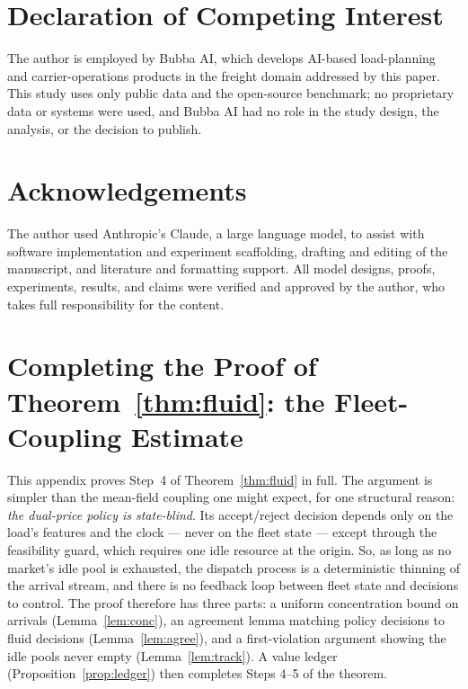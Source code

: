 \documentclass[11pt]{article}
\begin{document}
\section*{Declaration of Competing Interest}

The author is employed by Bubba AI, which develops AI-based
load-planning and carrier-operations products in the freight domain
addressed by this paper. This study uses only public data and the
open-source benchmark; no proprietary data or systems were used, and
Bubba AI had no role in the study design, the analysis, or the decision
to publish.

\section*{Acknowledgements}

The author used Anthropic's Claude, a large language model, to assist
with software implementation and experiment scaffolding, drafting and
editing of the manuscript, and literature and formatting support. All
model designs, proofs, experiments, results, and claims were verified
and approved by the author, who takes full responsibility for the
content.

\appendix

\section{Completing the Proof of Theorem~\ref{thm:fluid}: the
Fleet-Coupling Estimate}
\label{sec:coupling}

This appendix proves Step~4 of Theorem~\ref{thm:fluid} in full. The
argument is simpler than the mean-field coupling one might expect, for
one structural reason: \emph{the dual-price policy is state-blind}. Its
accept/reject decision depends only on the load's features and the
clock --- never on the fleet state --- except through the feasibility
guard, which requires one idle resource at the origin. So, as long as
no market's idle pool is exhausted, the dispatch process is a
deterministic thinning of the arrival stream, and there is no feedback
loop between fleet state and decisions to control. The proof therefore
has three parts: a uniform concentration bound on arrivals
(Lemma~\ref{lem:conc}), an agreement lemma matching policy decisions to
fluid decisions (Lemma~\ref{lem:agree}), and a first-violation argument
showing the idle pools never empty (Lemma~\ref{lem:track}). A value
ledger (Proposition~\ref{prop:ledger}) then completes Steps 4--5 of the
theorem.
\end{document}
